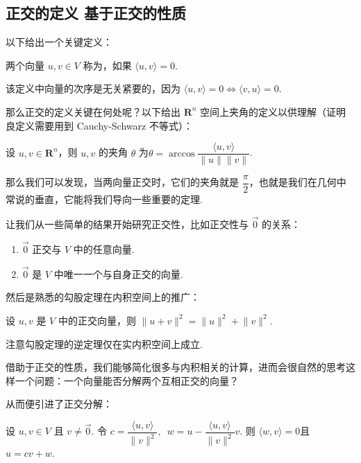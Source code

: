 \subsection{正交的定义 \quad 基于正交的性质}

以下给出一个关键定义：

\begin{definition} 
    两个向量 $u, v \in V$ 称为，如果 $\langle u, v\rangle = 0$.
\end{definition}

该定义中向量的次序是无关紧要的，因为 $\langle u, v\rangle = 0 \iff \langle v, u\rangle = 0$.

那么正交的定义关键在何处呢？以下给出 $\mathbf{R}^{n}$ 空间上夹角的定义以供理解（证明良定义需要用到 Cauchy-Schwarz 不等式）：

\begin{definition}
    设 $u, v \in \mathbf{R}^{n}$，则 $u, v$ 的夹角 $ \theta $ 为$ \theta = \arccos \dfrac{\langle u, v\rangle}{\lVert u \rVert \lVert v \rVert}$.
\end{definition}

那么我们可以发现，当两向量正交时，它们的夹角就是 $\dfrac{\pi}{2}$，也就是我们在几何中常说的垂直，它能将我们导向一些重要的定理.

让我们从一些简单的结果开始研究正交性，比如正交性与 $ \vec{0} $ 的关系：

\begin{enumerate}
    \item $ \vec{0} $ 正交与 $V$ 中的任意向量.

    \item $ \vec{0} $ 是 $V$ 中唯一一个与自身正交的向量.
\end{enumerate}

然后是熟悉的勾股定理在内积空间上的推广：

\begin{theorem}
    设 $u, v$ 是 $V$ 中的正交向量，则 $\lVert u + v \rVert^2 = \lVert u \rVert^2 + \lVert v \rVert^2 $.
\end{theorem}

注意勾股定理的逆定理仅在实内积空间上成立.

借助于正交的性质，我们能够简化很多与内积相关的计算，进而会很自然的思考这样一个问题：一个向量能否分解两个互相正交的向量？

从而便引进了正交分解：

\begin{theorem}
    设 $u, v \in V$ 且 $v \neq \vec{0}$. 令 $ c = \dfrac{\langle u, v\rangle}{\lVert v \rVert^2}, \enspace w = u - \dfrac{\langle u, v\rangle}{\lVert v \rVert^2}v$. 则 $\langle w, v\rangle = 0$且 $u = cv + w$.
\end{theorem}

